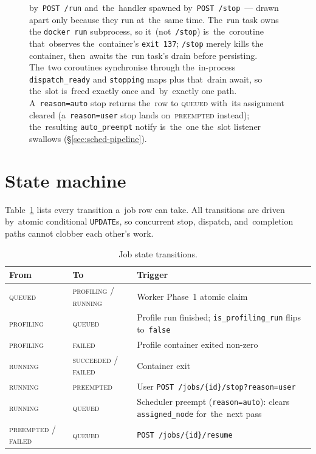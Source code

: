\begin{figure}[H]
{by~\texttt{POST /run} and~the~handler spawned by~\texttt{POST /stop}~--- drawn
apart only because they run at~the~same time.  The~run task owns the
\texttt{docker run} subprocess, so it~(not~\texttt{/stop}) is~the~coroutine
that~observes the~container's \texttt{exit 137}; \texttt{/stop} merely kills the
container, then~awaits the~run task's drain before persisting.  The~two
coroutines synchronise through the~in-process \texttt{dispatch\_ready} and
\texttt{stopping} maps plus that~drain await, so the~slot is~freed exactly once
and~by~exactly one path.  A~\texttt{reason=auto} stop returns the~row to
\textsc{queued} with~its assignment cleared (a~\texttt{reason=user} stop lands
on~\textsc{preempted} instead); the~resulting \texttt{auto\_preempt} notify
is~the~one the~slot listener swallows (\S\ref{sec:sched-pipeline}).}
\label{fig:seq-worker-stop}
\end{figure}

\section{State machine}

Table~\ref{tab:state-machine} lists every transition a~job row can take.
All transitions are driven by~atomic conditional \texttt{UPDATE}s, so
concurrent stop, dispatch, and~completion paths cannot clobber each
other's work.

\begin{table}[H]
\centering\small
\begin{tabularx}{\textwidth}{@{}l l X@{}}
\toprule
\textbf{From} & \textbf{To} & \textbf{Trigger} \\
\midrule
\textsc{queued}     & \textsc{profiling} / \textsc{running} & Worker Phase~1 atomic claim \\
\textsc{profiling}  & \textsc{queued}     & Profile run finished; \texttt{is\_profiling\_run} flips to~\texttt{false} \\
\textsc{profiling}  & \textsc{failed}     & Profile container exited non-zero \\
\textsc{running}    & \textsc{succeeded} / \textsc{failed} & Container exit \\
\textsc{running}    & \textsc{preempted}  & User \texttt{POST /jobs/\{id\}/stop?reason=user} \\
\textsc{running}    & \textsc{queued}     & Scheduler preempt (\texttt{reason=auto}): clears \texttt{assigned\_node} for~the~next pass \\
\textsc{preempted} / \textsc{failed} & \textsc{queued} & \texttt{POST /jobs/\{id\}/resume} \\
\bottomrule
\end{tabularx}
\caption{Job state transitions.}\label{tab:state-machine}
\end{table}

